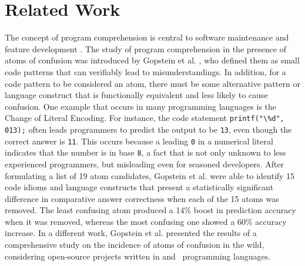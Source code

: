
\section{Related Work}

\label{back}

The concept of program comprehension is central to software maintenance and feature development \cite{DBLP:conf/iwpc/TilleySP96, DBLP:journals/ibmsj/OHareT94}. The study of program comprehension in the presence of atoms of confusion was introduced by Gopstein et al. \cite{DBLP:conf/msr/GopsteinZFC18}, who defined them as small code patterns that can verifiably lead to misunderstandings. In addition, for a code pattern to be considered an atom, there must be some alternative pattern or language construct that is functionally equivalent and less likely to cause confusion. One example that occurs in many programming languages is the Change of Literal Encoding. For instance, the \clang code statement \lstinline{printf("\%d", 013);} 
often leads programmers to predict the output to be \texttt{13}, even though the correct answer is \texttt{11}. This occurs because a leading \texttt{0} in a numerical literal indicates that the number is in base \texttt{8}, a fact that is not only unknown to less experienced programmers, but misleading even for seasoned developers. After formulating a list of 19 atom candidates, Gopstein et al. \cite{DBLP:conf/sigsoft/GopsteinIYDZYC17} were able to identify 15 code idioms and language constructs that present a statistically significant difference in comparative answer correctness when each of the 15 atoms was removed. The least confusing atom produced a 14\% boost in prediction accuracy when it was removed, whereas the most confusing one showed a 60\% accuracy increase. In a different work, Gopstein et al. \cite{DBLP:conf/msr/GopsteinZFC18} presented the results of a comprehensive study on the incidence of atoms of confusion in the wild, considering open-source projects written in \clang and \cpplang~programming languages.


